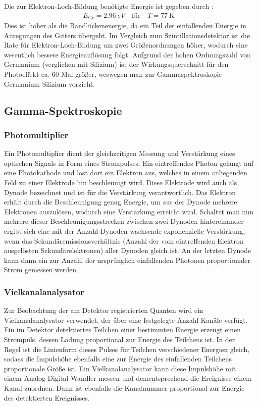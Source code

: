 \documentclass[11pt, a4paper]{article}
\numberwithin{equation}{section}
\begin{document}
Die zur Elektron-Loch-Bildung benötigte Energie ist gegeben durch \cite{leo}:
\begin{align}
E_\mathrm{Ge} = \SI{2.96}{eV} \quad \text{für}\quad T = \SI{77}{\kelvin}
\end{align}
Dies ist höher als die Bandlückenenergie, da ein Teil der einfallenden Energie in 
Anregungen des Gitters übergeht.
Im Vergleich zum Szintillationsdetektor ist die Rate für Elektron-Loch-Bildung um zwei Größenordnungen höher, wodurch eine wesentlich bessere Energieauflösung folgt.
Aufgrund der hohen Ordnungszahl von Germanium (verglichen mit Silizium) ist der Wirkungsquerschnitt für den Photoeffekt ca. \num{60} Mal größer, weswegen man zur Gammaspektroskopie Germanium Silizium vorzieht.

\subsection{Gamma-Spektroskopie}

\subsubsection{Photomultiplier}
Ein Photomultiplier dient der gleichzeitigen Messung und Verstärkung eines optischen Signals in Form eines Strompulses.
Ein eintreffendes Photon gelangt auf eine Photokathode und löst dort ein Elektron aus, welches in einem anliegenden Feld zu einer Elektrode hin beschleunigt wird.
Diese Elektrode wird auch als Dynode bezeichnet und ist für die Verstärkung verantwortlich.
Das Elektron erhält durch die Beschleunigung genug Energie, um aus der Dynode mehrere Elektronen auszulösen, wodurch eine Verstärkung erreicht wird.
Schaltet man nun mehrere dieser Beschleunigungsstrecken zwischen zwei Dynoden hintereinander ergibt sich eine mit der Anzahl Dynoden wachsende exponenzielle Verstärkung, wenn das Sekundäremissionsverhältnis (Anzahl der vom eintreffenden Elektron ausgelösten Sekundärelektronen) aller Dynoden gleich ist.
An der letzten Dynode kann dann ein zur Anzahl der ursprünglich einfallenden Photonen proportionaler Strom gemessen werden.

\subsubsection{Vielkanalanalysator}
Zur Beobachtung der am Detektor registrierten Quanten wird ein Vielkanalanalysator verwendet, der über eine festgelegte Anzahl Kanäle verfügt.
Ein im Detektor detektiertes Teilchen einer bestimmten Energie erzeugt einen Strompuls, dessen Ladung proportional zur Energie des Teilchens ist.
In der Regel ist die Linienform dieses Pulses für Teilchen verschiedener Energien gleich, sodass die Impulshöhe ebenfalls eine zur Energie des einfallenden Teilchens proportionale Größe ist.
Ein Vielkanalanalysator kann diese Impulshöhe mit einem Analog-Digital-Wandler messen und dementsprechend die Ereignisse einem Kanal zuordnen.
Dann ist ebenfalls die Kanalnummer proportional zur Energie des detektierten Ereignisses.
\end{document}
